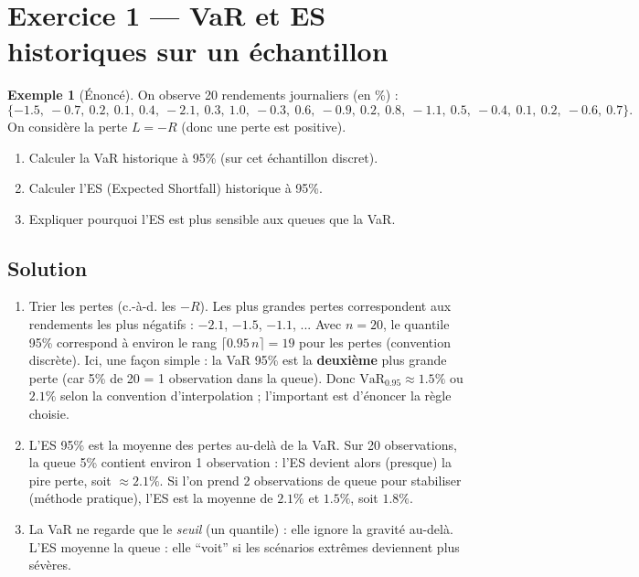 \documentclass[11pt,a4paper]{report}
\newcommand{\1}{\mathbbm{1}}
\newcommand{\VaR}{\mathrm{VaR}}
\theoremstyle{definition}
\newtheorem{example}{Exemple}[chapter]
\theoremstyle{plain}
\theoremstyle{remark}
\begin{document}
\section{Exercice 1 --- VaR et ES historiques sur un échantillon}
\begin{example}[Énoncé]
On observe 20 rendements journaliers (en \%) :
\[
\{-1.5,\ -0.7,\ 0.2,\ 0.1,\ 0.4,\ -2.1,\ 0.3,\ 1.0,\ -0.3,\ 0.6,\ -0.9,\ 0.2,\ 0.8,\ -1.1,\ 0.5,\ -0.4,\ 0.1,\ 0.2,\ -0.6,\ 0.7\}.
\]
On considère la perte $L=-R$ (donc une perte est positive).
\begin{enumerate}[label=\alph*)]
  \item Calculer la VaR historique à 95\% (sur cet échantillon discret).
  \item Calculer l'ES (Expected Shortfall) historique à 95\%.
  \item Expliquer pourquoi l'ES est plus sensible aux queues que la VaR.
\end{enumerate}
\end{example}

\subsection*{Solution}
\begin{enumerate}[label=\alph*)]
  \item Trier les pertes (c.-à-d. les $-R$). Les plus grandes pertes correspondent aux rendements les plus négatifs : $-2.1$, $-1.5$, $-1.1$, ...
  Avec $n=20$, le quantile 95\% correspond à environ le rang $\lceil 0.95\,n\rceil=19$ pour les pertes (convention discrète).
  Ici, une façon simple : la VaR 95\% est la \textbf{deuxième} plus grande perte (car 5\% de 20 = 1 observation dans la queue).
  Donc $\VaR_{0.95}\approx 1.5\%$ ou $2.1\%$ selon la convention d'interpolation ; l'important est d'énoncer la règle choisie.
  \item L'ES 95\% est la moyenne des pertes au-delà de la VaR.
  Sur 20 observations, la queue 5\% contient environ 1 observation : l'ES devient alors (presque) la pire perte, soit $\approx 2.1\%$.
  Si l'on prend 2 observations de queue pour stabiliser (méthode pratique), l'ES est la moyenne de $2.1\%$ et $1.5\%$, soit $1.8\%$.
  \item La VaR ne regarde que le \emph{seuil} (un quantile) : elle ignore la gravité au-delà.
  L'ES moyenne la queue : elle ``voit'' si les scénarios extrêmes deviennent plus sévères.
\end{enumerate}
\end{document}
